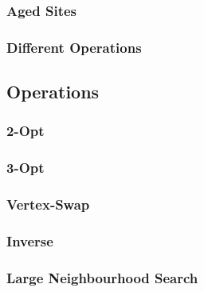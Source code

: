 
\subsubsection{Aged Sites}


\subsubsection{Different Operations}

\subsection{Operations}

\subsubsection{2-Opt}

\subsubsection{3-Opt}

\subsubsection{Vertex-Swap}

\subsubsection{Inverse}

\subsubsection{Large Neighbourhood Search}

    



